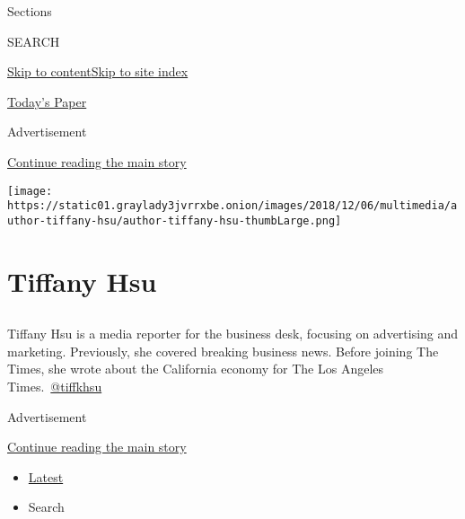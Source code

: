 Sections

SEARCH

\protect\hyperlink{site-content}{Skip to
content}\protect\hyperlink{site-index}{Skip to site index}

\href{https://myaccount.nytimes3xbfgragh.onion/auth/login?response_type=cookie\&client_id=vi}{}

\href{https://www.nytimes3xbfgragh.onion/section/todayspaper}{Today's
Paper}

Advertisement

\protect\hyperlink{after-top}{Continue reading the main story}

\texttt{[image: https://static01.graylady3jvrrxbe.onion/images/2018/12/06/multimedia/author-tiffany-hsu/author-tiffany-hsu-thumbLarge.png]}

\hypertarget{tiffany-hsu}{%
\section{Tiffany Hsu}\label{tiffany-hsu}}

\subsection{}

Tiffany Hsu is a media reporter for the business desk, focusing on
advertising and marketing. Previously, she covered breaking business
news. Before joining The Times, she wrote about the California economy
for The Los Angeles
Times.~\href{https://twitter.com/tiffkhsu}{@tiffkhsu}

Advertisement

\protect\hyperlink{after-mid1}{Continue reading the main story}

\begin{itemize}
\tightlist
\item
  \protect\hyperlink{stream-panel}{Latest}
\item
  Search
\end{itemize}

